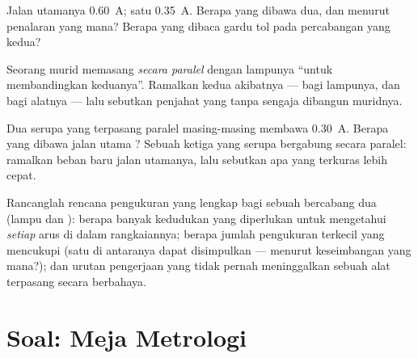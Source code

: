 \begin{exercise}[$\star\star$]\label{exo:g8:intensity-ammeter:9}
Jalan utamanya \qty{0.60}{A};  satu \qty{0.35}{A}. Berapa yang
dibawa  dua, dan menurut penalaran yang mana? Berapa yang dibaca
gardu tol pada percabangan yang kedua?
\end{exercise}

\begin{exercise}[$\star\star$]\label{exo:g8:intensity-ammeter:10}
Seorang murid memasang  \emph{secara paralel} dengan
lampunya ``untuk membandingkan keduanya''. Ramalkan kedua akibatnya
--- bagi lampunya, dan bagi alatnya --- lalu sebutkan penjahat yang
tanpa sengaja dibangun muridnya.
\end{exercise}

\begin{exercise}[$\star\star$]\label{exo:g8:intensity-ammeter:11}
Dua  serupa yang terpasang paralel masing-masing membawa
\qty{0.30}{A}. Berapa yang dibawa jalan utama ? Sebuah
 ketiga yang serupa bergabung secara paralel: ramalkan beban
baru jalan utamanya, lalu sebutkan apa yang terkuras lebih cepat.
\end{exercise}

\begin{exercise}[$\star\star\star$]\label{exo:g8:intensity-ammeter:12}
Rancanglah rencana pengukuran yang lengkap bagi sebuah  bercabang dua (lampu dan ): berapa banyak kedudukan
 yang diperlukan untuk mengetahui \emph{setiap} arus di
dalam rangkaiannya; berapa jumlah pengukuran terkecil yang mencukupi
(satu di antaranya dapat disimpulkan --- menurut keseimbangan yang
mana?); dan urutan pengerjaan yang tidak pernah meninggalkan sebuah
alat terpasang secara berbahaya.
\end{exercise}

\section{Soal: Meja Metrologi}

